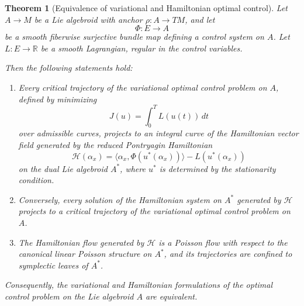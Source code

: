 \documentclass[10pt,a4paper]{amsart}
\newtheorem{theorem}{Theorem}
\begin{document}
\begin{theorem}[Equivalence of variational and Hamiltonian optimal control]
Let $A \to M$ be a Lie algebroid with anchor $\rho : A \to TM$, and let
\[
\Phi : E \to A
\]
be a smooth fiberwise surjective bundle map defining a control system on $A$.  
Let $L : E \to \mathbb{R}$ be a smooth Lagrangian, regular in the control variables.

Then the following statements hold:

\begin{enumerate}
\item[(i)] Every critical trajectory of the variational optimal control problem on $A$, defined by minimizing
\[
J(u) = \int_0^T L(u(t))\,dt
\]
over admissible curves, projects to an integral curve of the Hamiltonian vector field generated by the reduced Pontryagin Hamiltonian
\[
\mathcal{H}(\alpha_x) = \langle \alpha_x, \Phi(u^*(\alpha_x)) \rangle - L(u^*(\alpha_x))
\]
on the dual Lie algebroid $A^*$, where $u^*$ is determined by the stationarity condition.

\item[(ii)] Conversely, every solution of the Hamiltonian system on $A^*$ generated by $\mathcal{H}$ projects to a critical trajectory of the variational optimal control problem on $A$.

\item[(iii)] The Hamiltonian flow generated by $\mathcal{H}$ is a Poisson flow with respect to the canonical linear Poisson structure on $A^*$, and its trajectories are confined to symplectic leaves of $A^*$.

\end{enumerate}

Consequently, the variational and Hamiltonian formulations of the optimal control problem on the Lie algebroid $A$ are equivalent.
\end{theorem}
\end{document}
